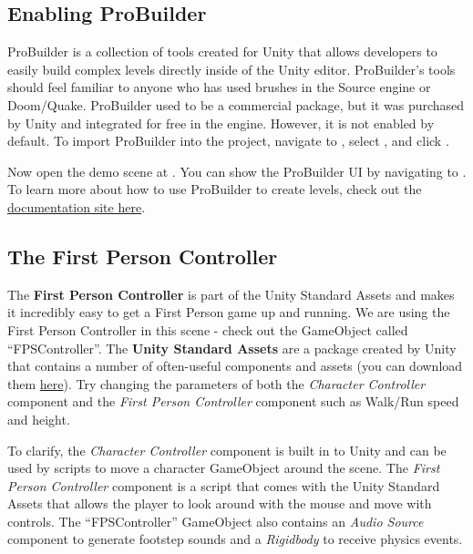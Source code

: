 \documentclass[11pt]{article}
\begin{document}
\subsection{Enabling ProBuilder}

ProBuilder is a collection of tools created for Unity that allows developers to easily build complex levels directly inside of the Unity editor.  ProBuilder's tools should feel familiar to anyone who has used brushes in the Source engine or Doom/Quake.  ProBuilder used to be a commercial package, but it was purchased by Unity and integrated for free in the engine.  However, it is not enabled by default.  To import ProBuilder into the project, navigate to , select , and click .

Now open the demo scene at .  You can show the ProBuilder UI by navigating to .  To learn more about how to use ProBuilder to create levels, check out the \href{https://docs.unity3d.com/Packages/com.unity.probuilder@4.0/manual/index.html}{documentation site here}.

\subsection{The First Person Controller}

The \textbf{First Person Controller} is part of the Unity Standard Assets and makes it incredibly easy to get a First Person game up and running.  We are using the First Person Controller in this scene - check out the GameObject called ``FPSController''.  The \textbf{Unity Standard Assets} are a package created by Unity that contains a number of often-useful components and assets (you can download them \href{https://assetstore.unity.com/packages/essentials/asset-packs/standard-assets-32351}{here}).  Try changing the parameters of both the \textit{Character Controller} component and the \textit{First Person Controller} component such as Walk/Run speed and height.

To clarify, the \textit{Character Controller} component is built in to Unity and can be used by scripts to move a character GameObject around the scene.  The \textit{First Person Controller} component is a script that comes with the Unity Standard Assets that allows the player to look around with the mouse and move with  controls.  The ``FPSController'' GameObject also contains an \textit{Audio Source} component to generate footstep sounds and a \textit{Rigidbody} to receive physics events.
\end{document}

